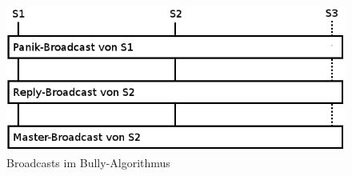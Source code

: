 \documentclass[german,12pt,a4paper]{article}
\begin{document}
\begin{figure}[h!]
  \centering
  \includegraphics[width=1\textwidth]{bully2.png}
  \caption{Broadcasts im Bully-Algorithmus}
\end{figure}
\end{document}
